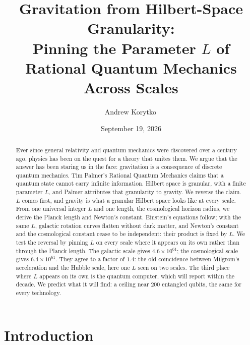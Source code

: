 \documentclass[aps,prd,twocolumn,superscriptaddress,nofootinbib,showkeys]{revtex4-2}
\begin{document}
\title{Gravitation from Hilbert-Space Granularity:\\ Pinning the Parameter $L$ of Rational Quantum Mechanics Across Scales}

\author{Andrew Korytko\,}

\date{September 19, 2026}

\begin{abstract}
Ever since general relativity and quantum mechanics were discovered over a century ago, physics has been on the quest for a theory that unites them. We argue that the answer has been staring us in the face: gravitation is a consequence of discrete quantum mechanics. Tim Palmer's Rational Quantum Mechanics claims that a quantum state cannot carry infinite information. Hilbert space is granular, with a finite parameter $L$, and Palmer attributes that granularity to gravity. We reverse the claim. $L$ comes first, and gravity is what a granular Hilbert space looks like at every scale. From one universal integer $L$ and one length, the cosmological horizon radius, we derive the Planck length and Newton's constant. Einstein's equations follow; with the same $L$, galactic rotation curves flatten without dark matter, and Newton's constant and the cosmological constant cease to be independent: their product is fixed by $L$. We test the reversal by pinning $L$ on every scale where it appears on its own rather than through the Planck length. The galactic scale gives $4.6\times10^{61}$; the cosmological scale gives $6.4\times10^{61}$. They agree to a factor of $1.4$: the old coincidence between Milgrom's acceleration and the Hubble scale, here one $L$ seen on two scales. The third place where $L$ appears on its own is the quantum computer, which will report within the decade. We predict what it will find: a ceiling near $200$ entangled qubits, the same for every technology.
\end{abstract}


\maketitle

\section{Introduction}
\end{document}
